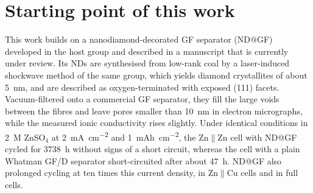 \section{Starting point of this work}
\label{sec:starting-point}

This work builds on a nanodiamond-decorated GF separator (ND@GF) developed in the host group and described in a manuscript that is currently under review\cite{zhang_crystal_2026}.
Its NDs are synthesised from low-rank coal by a laser-induced shockwave method of the same group, which yields diamond crystallites of about \SI{5}{nm}\cite{zhang_silicon-mediated_2026}, and are described as oxygen-terminated with exposed (111) facets\cite{zhang_crystal_2026}.
Vacuum-filtered onto a commercial GF separator, they fill the large voids between the fibres and leave pores smaller than \SI{10}{nm} in electron micrographs, while the measured ionic conductivity rises slightly\cite{zhang_crystal_2026}.
Under identical conditions in \SI{2}{M} ZnSO$_4$ at \SI{2}{mA.cm^{-2}} and \SI{1}{mAh.cm^{-2}}, the Zn$\|$Zn cell with ND@GF cycled for \SI{3738}{h} without signs of a short circuit, whereas the cell with a plain Whatman GF/D separator short-circuited after about \SI{47}{h}\cite{zhang_crystal_2026}.
ND@GF also prolonged cycling at ten times this current density, in Zn$\|$Cu cells and in full cells\cite{zhang_crystal_2026}.

